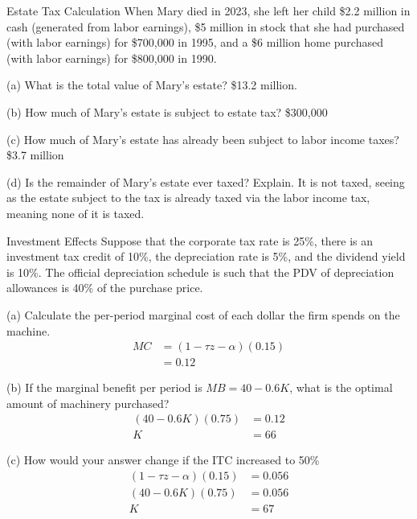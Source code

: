 \documentclass[10pt]{extarticle}
\begin{document}
  \begin{problem}{Estate Tax Calculation}
    When Mary died in 2023, she left her child \$2.2 million in cash (generated from labor earnings), \$5 million in stock that she had purchased (with labor earnings) for \$700,000 in 1995, and a \$6 million home purchased (with labor earnings) for \$800,000 in 1990.
    \tcblower
    \begin{problem}{(a)}
      What is the total value of Mary's estate?
      \tcblower
      \$13.2 million.
    \end{problem}
    \begin{problem}{(b)}
      How much of Mary's estate is subject to estate tax?
      \tcblower
      \$300,000
    \end{problem}
    \begin{problem}{(c)}
      How much of Mary's estate has already been subject to labor income taxes?
      \tcblower
      \$3.7 million
    \end{problem}
    \begin{problem}{(d)}
      Is the remainder of Mary's estate ever taxed? Explain.
      \tcblower
      It is not taxed, seeing as the estate subject to the tax is already taxed via the labor income tax, meaning none of it is taxed.
    \end{problem}
  \end{problem}
  \begin{problem}{Investment Effects}
    Suppose that the corporate tax rate is 25\%, there is an investment tax credit of 10\%, the depreciation rate is 5\%, and the dividend yield is 10\%. The official depreciation schedule is such that the PDV of depreciation allowances is 40\% of the purchase price.
    \tcblower
    \begin{problem}{(a)}
      Calculate the per-period marginal cost of each dollar the firm spends on the machine.
      \tcblower
      \begin{align*}
        MC &= (1-\tau z - \alpha)(0.15)\\
           &= 0.12
      \end{align*}
    \end{problem}
    \begin{problem}{(b)}
      If the marginal benefit per period is $MB = 40-0.6K$, what is the optimal amount of machinery purchased?
      \tcblower
      \begin{align*}
        \left(40-0.6K\right)(0.75) &= 0.12\\
        K &= 66
      \end{align*}
    \end{problem}
    \begin{problem}{(c)}
      How would your answer change if the ITC increased to 50\%
      \begin{align*}
        (1-\tau z - \alpha)(0.15) &= 0.056\\
        \left(40-0.6K\right)(0.75) &= 0.056\\
        K &= 67
      \end{align*}
    \end{problem}
  \end{problem}
\end{document}
